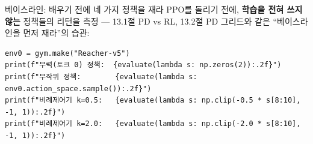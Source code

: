 \begin{frame}[fragile]{베이스라인: 배우기 전에 네 가지 정책을 재라}
  PPO를 돌리기 전에, \textbf{학습을 전혀 쓰지 않는} 정책들의 리턴을
  측정 --- 13.1절 PD vs RL, 13.2절 PD 그리드와 같은 ``베이스라인을
  먼저 재라''의 습관:
\begin{lstlisting}
env0 = gym.make("Reacher-v5")
print(f"무력(토크 0) 정책:  {evaluate(lambda s: np.zeros(2)):.2f}")
print(f"무작위 정책:        {evaluate(lambda s: env0.action_space.sample()):.2f}")
print(f"비례제어기 k=0.5:   {evaluate(lambda s: np.clip(-0.5 * s[8:10], -1, 1)):.2f}")
print(f"비례제어기 k=2.0:   {evaluate(lambda s: np.clip(-2.0 * s[8:10], -1, 1)):.2f}")
\end{lstlisting}
\end{frame}
